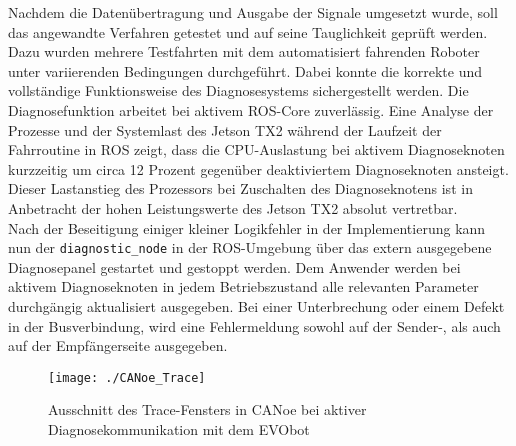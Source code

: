 Nachdem die Datenübertragung und Ausgabe der Signale umgesetzt wurde, soll das angewandte Verfahren getestet und auf seine Tauglichkeit geprüft werden.\\
Dazu wurden mehrere Testfahrten mit dem automatisiert fahrenden Roboter unter variierenden Bedingungen durchgeführt. Dabei konnte die korrekte und vollständige Funktionsweise des Diagnosesystems sichergestellt werden. Die Diagnosefunktion arbeitet bei aktivem ROS-Core zuverlässig. Eine Analyse der Prozesse und der Systemlast des Jetson TX2 während der Laufzeit der Fahrroutine in ROS zeigt, dass die CPU-Auslastung bei aktivem Diagnoseknoten kurzzeitig um circa 12 Prozent gegenüber deaktiviertem Diagnoseknoten ansteigt. Dieser Lastanstieg des Prozessors bei Zuschalten des Diagnoseknotens ist in Anbetracht der hohen Leistungswerte des Jetson TX2 absolut vertretbar. \\
Nach der Beseitigung einiger kleiner Logikfehler in der Implementierung kann nun der \texttt{diagnostic\_node} in der ROS-Umgebung über das extern ausgegebene Diagnosepanel gestartet und gestoppt werden. Dem Anwender werden bei aktivem Diagnoseknoten in jedem Betriebszustand alle relevanten Parameter durchgängig aktualisiert ausgegeben. Bei einer Unterbrechung oder einem Defekt in der Busverbindung, wird eine Fehlermeldung sowohl auf der Sender-, als auch auf der Empfängerseite ausgegeben.\\

\begin{figure}[!htbp]
	\centering
	\texttt{[image: ./CANoe\_Trace]}
	\caption{Ausschnitt des Trace-Fensters in CANoe bei aktiver Diagnosekommunikation mit dem EVObot}
	\label{abb:CANoe_Trace}
\end{figure}

